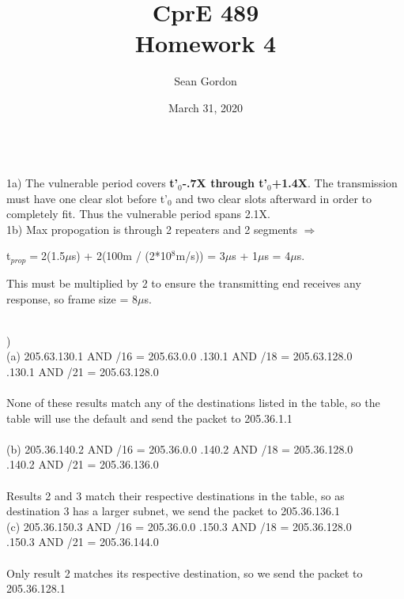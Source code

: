 \documentclass[12pt]{article}
\title{CprE 489\\Homework 4}
\author{Sean Gordon}
\date{March 31, 2020}
\begin{document}
\maketitle


\hrulefill \\


\noindent 1a) The vulnerable period covers {\bf t'$_0$-.7X through t'$_0$+1.4X}. The transmission must have one clear slot before t'$_0$ and two clear slots afterward in order to completely fit. Thus the vulnerable period spans 2.1X.\\

\noindent 1b) Max propogation is through 2 repeaters and 2 segments $\Rightarrow$ \\[-2em]
\begin{center}
t$_{prop} = $2(1.5$\mu$s) + 2(100m / (2*10$^8$m/s)) = 3$\mu$s + 1$\mu$s = 4$\mu$s.
\end{center}
This must be multiplied by 2 to ensure the transmitting end receives any response, so frame size = 8$\mu$s.


\hrulefill \\


) \\
\indent (a) 205.63.130.1 AND /16 = 205.63.0.0 .130.1 AND /18 = 205.63.128.0 \\
\indent {}.130.1 AND /21 = 205.63.128.0\\\\
\indent \indent None of these results match any of the destinations listed in the table, so the \\
\indent \indent table will use the default and send the packet to 205.36.1.1\\\\

\indent (b) 205.36.140.2 AND /16 = 205.36.0.0 .140.2 AND /18 = 205.36.128.0 \\
\indent {}.140.2 AND /21 = 205.36.136.0\\\\
\indent \indent Results 2 and 3 match their respective destinations in the table, so as \\
\indent \indent destination 3 has a larger subnet, we send the packet to 205.36.136.1\\

\indent (c) 205.36.150.3 AND /16 = 205.36.0.0 .150.3 AND /18 = 205.36.128.0 \\
\indent {}.150.3 AND /21 = 205.36.144.0\\\\
\indent \indent Only result 2 matches its respective destination, so we send the packet to 205.36.128.1
\end{document}
